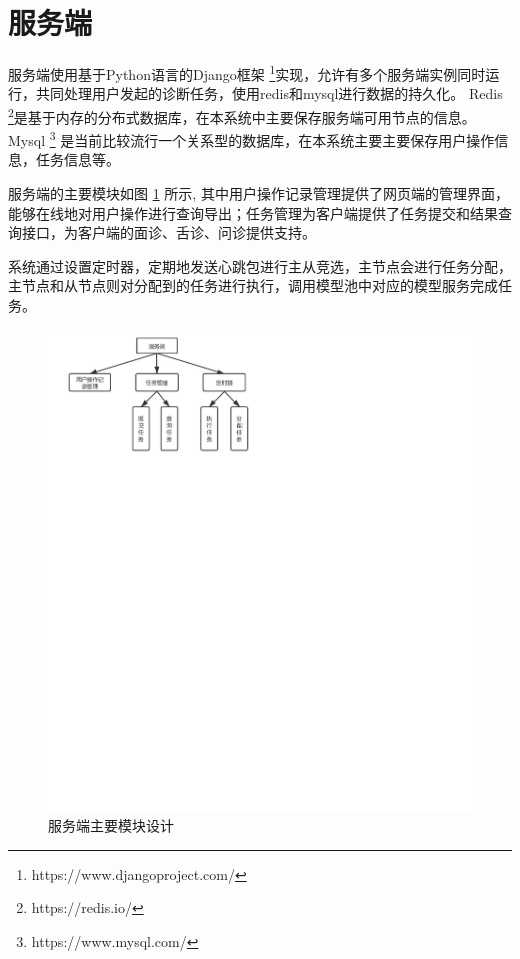 \section{服务端}

服务端使用基于Python语言的Django框架 \footnote{https://www.djangoproject.com/}实现，允许有多个服务端实例同时运行，共同处理用户发起的诊断任务，使用redis和mysql进行数据的持久化。
Redis \footnote{https://redis.io/}是基于内存的分布式数据库，在本系统中主要保存服务端可用节点的信息。
Mysql \footnote{https://www.mysql.com/} 是当前比较流行一个关系型的数据库，在本系统主要主要保存用户操作信息，任务信息等。       

服务端的主要模块如图 \ref{fig:server} 所示, 其中用户操作记录管理提供了网页端的管理界面，能够在线地对用户操作进行查询导出；任务管理为客户端提供了任务提交和结果查询接口，为客户端的面诊、舌诊、问诊提供支持。

系统通过设置定时器，定期地发送心跳包进行主从竞选，主节点会进行任务分配，主节点和从节点则对分配到的任务进行执行，调用模型池中对应的模型服务完成任务。


\begin{figure}[ht]
    \centering
    \includegraphics[width=15cm]{images/server.pdf}
    \caption{服务端主要模块设计}
    \label{fig:server}
\end{figure}


